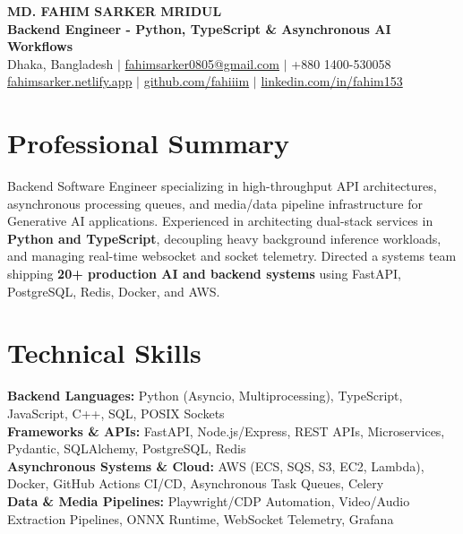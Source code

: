 \documentclass[9.5pt,a4paper]{article}
\begin{document}
{\centering
    {\Large \textbf{MD. FAHIM SARKER MRIDUL}}\\[1pt]
    \textbf{Backend Engineer - Python, TypeScript \& Asynchronous AI Workflows}\\[1pt]
    Dhaka, Bangladesh \;$\vert$\; \href{mailto:fahimsarker0805@gmail.com}{fahimsarker0805@gmail.com} \;$\vert$\; +880 1400-530058\\[1pt]
    \href{https://fahimsarker.netlify.app}{fahimsarker.netlify.app} \;$\vert$\; \href{https://github.com/fahiiim}{github.com/fahiiim} \;$\vert$\; \href{https://linkedin.com/in/fahim153}{linkedin.com/in/fahim153}\par
}

\vspace{-2.5pt}
\section*{Professional Summary}
Backend Software Engineer specializing in high-throughput API architectures, asynchronous processing queues, and media/data pipeline infrastructure for Generative AI applications. Experienced in architecting dual-stack services in \textbf{Python and TypeScript}, decoupling heavy background inference workloads, and managing real-time websocket and socket telemetry. Directed a systems team shipping \textbf{20+ production AI and backend systems} using FastAPI, PostgreSQL, Redis, Docker, and AWS.

\section*{Technical Skills}
\noindent
\textbf{Backend Languages:} Python (Asyncio, Multiprocessing), TypeScript, JavaScript, C++, SQL, POSIX Sockets\\
\textbf{Frameworks \& APIs:} FastAPI, Node.js/Express, REST APIs, Microservices, Pydantic, SQLAlchemy, PostgreSQL, Redis\\
\textbf{Asynchronous Systems \& Cloud:} AWS (ECS, SQS, S3, EC2, Lambda), Docker, GitHub Actions CI/CD, Asynchronous Task Queues, Celery\\
\textbf{Data \& Media Pipelines:} Playwright/CDP Automation, Video/Audio Extraction Pipelines, ONNX Runtime, WebSocket Telemetry, Grafana
\end{document}
